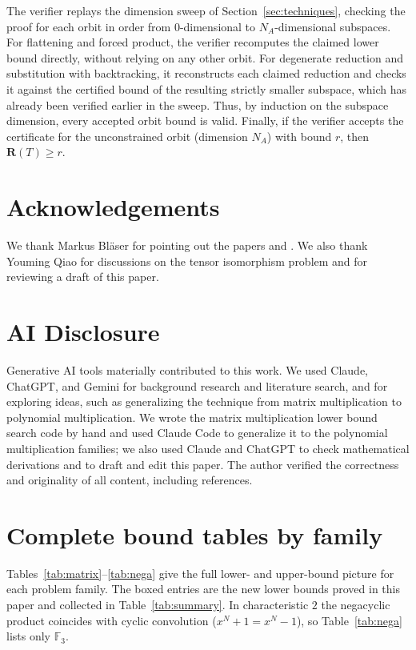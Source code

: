 \documentclass[11pt]{article}
\theoremstyle{definition}
\newcommand{\F}{\mathbb{F}}
\newcommand{\R}{\mathbf{R}}
\newif\ifanon
\begin{document}
The verifier replays the dimension sweep of Section~\ref{sec:techniques},
checking the proof for each orbit in order from $0$-dimensional to
$N_A$-dimensional subspaces.
For flattening and forced product, the verifier recomputes the claimed lower bound directly,
without relying on any other orbit. For degenerate reduction and substitution with backtracking,
it reconstructs each claimed reduction and checks it against
the certified bound of the resulting strictly smaller subspace,
which has already been verified earlier in the sweep.
Thus, by induction on the subspace dimension,
every accepted orbit bound is valid. Finally,
if the verifier accepts the certificate for the unconstrained orbit (dimension $N_A$)
with bound $r$, then $\R(T)\ge r$.

\section*{Acknowledgements}
\ifanon
Omitted for double-blind review.
\else
We thank Markus Bl\"aser for pointing out the papers \cite{ja1985improved} and
\cite{shpilka2001lower}. We also thank Youming
Qiao for discussions on the tensor isomorphism problem and for reviewing a draft of
this paper.
\fi

\section*{AI Disclosure}
Generative AI tools materially contributed to this work. We used Claude, ChatGPT,
and Gemini for background research and literature search, and for exploring ideas,
such as generalizing the technique from matrix
multiplication to polynomial multiplication. We wrote the matrix multiplication lower bound
search code by hand and used Claude Code to generalize it to the polynomial
multiplication families; we also used Claude and ChatGPT to check mathematical derivations
and to draft and edit this paper. The author verified the correctness and originality
of all content, including references.



\appendix

\section{Complete bound tables by family}\label{app:bound-tables}

Tables~\ref{tab:matrix}--\ref{tab:nega} give the full lower- and upper-bound picture
for each problem family. The boxed entries are the new lower bounds proved in this
paper and collected in Table~\ref{tab:summary}.
In characteristic $2$ the negacyclic product coincides with cyclic
convolution ($x^N+1=x^N-1$), so Table~\ref{tab:nega} lists only $\F_3$.
\end{document}
